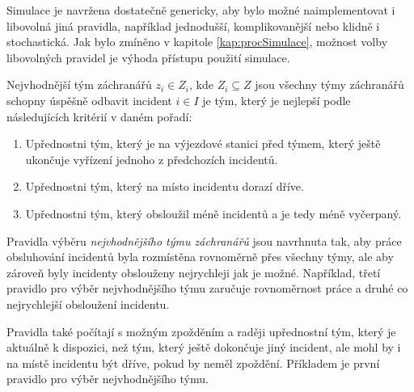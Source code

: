 Simulace je navržena dostatečně genericky, aby bylo možné naimplementovat i libovolná jiná pravidla, například jednodušší, komplikovanější nebo klidně i stochastická.
Jak bylo zmíněno v kapitole \ref{kap:procSimulace}, možnost volby libovolných pravidel je výhoda přístupu použití simulace.
\begin{definice}\label{df:simulacePravidla2}
  Nejvhodnější tým záchranářů $z_i \in Z_i$, kde $Z_i \subseteq Z$ jsou všechny týmy záchranářů schopny úspěšně odbavit incident $i \in I$ je tým,
  který je nejlepší podle následujících kritérií v daném pořadí:
  \begin{enumerate}
    \item Upřednostni tým, který je na výjezdové stanici před týmem, který ještě ukončuje vyřízení jednoho z předchozích incidentů. 
    \item Upřednostni tým, který na místo incidentu dorazí dříve. 
    \item Upřednostni tým, který obsloužil méně incidentů a je tedy méně vyčerpaný.
  \end{enumerate}
\end{definice}
Pravidla výběru \textit{nejvhodnějšího týmu záchranářů} jsou navrhnuta tak,
aby práce obsluhování incidentů byla rozmístěna rovnoměrně přes všechny týmy, ale aby zároveň byly incidenty obslouženy nejrychleji jak je možné.
Například, třetí pravidlo pro výběr nejvhodnějšího týmu zaručuje rovnoměrnost práce a druhé co nejrychlejší obsloužení incidentu.

Pravidla také počítají s možným zpožděním a raději upřednostní tým, který je aktuálně k dispozici, než tým, který ještě dokončuje jiný incident, ale mohl by i na místě incidentu
být dříve, pokud by neměl zpoždění. Příkladem je první pravidlo pro výběr nejvhodnějšího týmu.

